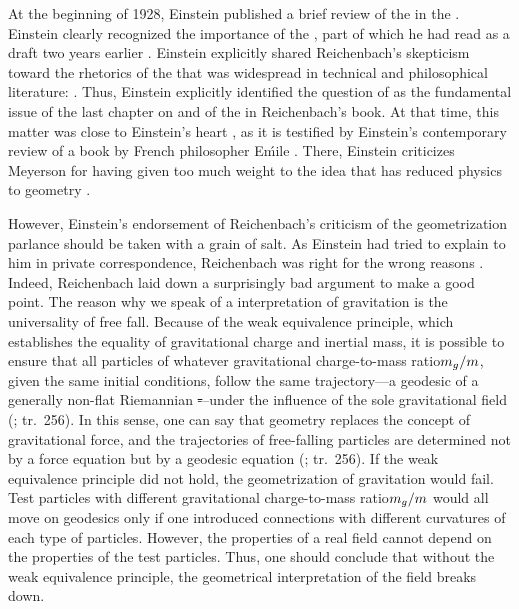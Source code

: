 \documentclass[final]{article}
\newcommand{\ctmr}{charge-to-mass ratio\xspace}
\newcommand{\ctmrg}{\ensuremath{\hfrac{m_g}{m}}\xspace}
\renewcommand{\me}{;~m.e.{}}
\newcommand{\PRZL}{\citetitle{Reichenbach1928}\xspace}
\renewcommand{\rzlp}[2]{(\cite[#1]{Reichenbach1928}; tr.\ #2)\xspace}
\begin{document}
At the beginning of 1928, Einstein published a brief review of the \PRZL \citep{Einstein1928d} in the . Einstein clearly recognized the importance of the \Ap, part of which he had read as a draft two years earlier . Einstein explicitly shared Reichenbach's skepticism toward the rhetorics of the  that was widespread in technical and philosophical literature:  \citep[][20\me]{Einstein1928d}. Thus, Einstein explicitly identified the question of  as the fundamental issue of the last chapter on \gr and of the \Ap in Reichenbach's book. At that time, this matter was close to Einstein's heart \citep{Lehmkuhl2014}, as it is testified by Einstein's contemporary review \citep{Einstein1928} of a book by French philosopher E\'mile \citet{Meyerson1925}. There, Einstein criticizes Meyerson for having given too much weight to the idea that \gr has reduced physics to geometry .

However, Einstein's endorsement of Reichenbach's criticism of the geometrization parlance should be taken with a grain of salt. As Einstein had tried to explain to him in private correspondence, Reichenbach was right for the wrong reasons . Indeed, Reichenbach laid down a surprisingly bad argument to make a good point. The reason why we speak of a  interpretation of gravitation is the universality of free fall. Because of the weak equivalence principle, which establishes the equality of gravitational charge and inertial mass, it is possible to ensure that all particles of whatever gravitational \ctmr \ctmrg, given the same initial conditions, follow the same trajectory---a geodesic of a generally non-flat Riemannian \st---under the influence of the sole gravitational field \rzlp{293}{256}. In this sense, one can say that geometry replaces the concept of gravitational force, and the trajectories of free-falling particles are determined not by a force equation but by a geodesic equation \rzlp{293}{256}. If the weak equivalence principle did not hold, the geometrization of gravitation would fail. Test particles with different gravitational \ctmr \ctmrg would all move on geodesics only if one introduced connections with different curvatures of each type of particles. However, the properties of a real field cannot depend on the properties of the test particles. Thus, one should conclude that without the weak equivalence principle, the geometrical interpretation of the field breaks down. 
\end{document}
